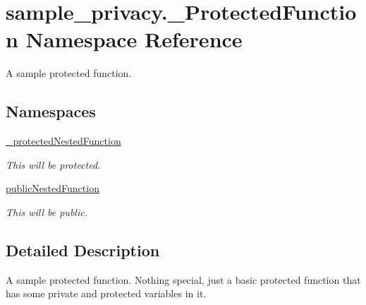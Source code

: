 \hypertarget{namespacesample__privacy_1_1___protected_function}{\section{sample\-\_\-privacy.\-\_\-\-Protected\-Function Namespace Reference}
\label{namespacesample__privacy_1_1___protected_function}
}


A sample protected function.  


\subsection*{Namespaces}
\begin{DoxyCompactItemize}
\item 
\hyperlink{namespacesample__privacy_1_1___protected_function_1_1__protected_nested_function}{\-\_\-protected\-Nested\-Function}
\begin{DoxyCompactList}\small\item\em This will be protected. \end{DoxyCompactList}\item 
\hyperlink{namespacesample__privacy_1_1___protected_function_1_1public_nested_function}{public\-Nested\-Function}
\begin{DoxyCompactList}\small\item\em This will be public. \end{DoxyCompactList}\end{DoxyCompactItemize}


\subsection{Detailed Description}
A sample protected function. Nothing special, just a basic protected function that has some private and protected variables in it. 